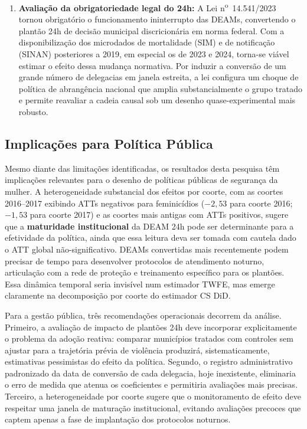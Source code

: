 \documentclass[twocolumn, 10pt]{article}
\begin{document}
\begin{enumerate}
  \item \textbf{Avaliação da obrigatoriedade legal do 24h:} A
        Lei n\textsuperscript{o}~14.541/2023 tornou obrigatório o funcionamento
        ininterrupto das DEAMs, convertendo o plantão 24h de decisão municipal
        discricionária em norma federal. Com a disponibilização dos microdados de
        mortalidade (SIM) e de notificação (SINAN) posteriores a 2019, em especial
        os de 2023 e 2024, torna-se viável estimar o efeito dessa mudança normativa.
        Por induzir a conversão de um grande número de delegacias em janela estreita,
        a lei configura um choque de política de abrangência nacional que amplia
        substancialmente o grupo tratado e permite reavaliar a cadeia causal sob um
        desenho quase-experimental mais robusto.
\end{enumerate}

\subsection{Implicações para Política Pública}

Mesmo diante das limitações identificadas, os resultados desta pesquisa têm
implicações relevantes para o desenho de políticas públicas de segurança da
mulher. A heterogeneidade substancial dos efeitos por coorte, com as coortes
2016--2017 exibindo ATTs negativos para feminicídios ($-2{,}53$ para coorte
2016; $-1{,}53$ para coorte 2017) e as coortes mais antigas com ATTs positivos,
sugere que a \textbf{maturidade institucional} da DEAM 24h pode ser
determinante para a efetividade da política, ainda que essa leitura deva ser
tomada com cautela dado o ATT global não-significativo. DEAMs convertidas mais
recentemente podem precisar de tempo para desenvolver protocolos de atendimento
noturno, articulação com a rede de proteção e treinamento específico para
os plantões. Essa dinâmica temporal seria invisível num estimador TWFE,
mas emerge claramente na decomposição por coorte do estimador CS DiD.

Para a gestão pública, três recomendações operacionais decorrem da análise.
Primeiro, a avaliação de impacto de plantões 24h deve incorporar explicitamente
o problema da adoção reativa: comparar municípios tratados com controles sem
ajustar para a trajetória prévia de violência produzirá, sistematicamente,
estimativas pessimistas do efeito da política. Segundo, o registro administrativo
padronizado da data de conversão de cada delegacia, hoje inexistente, eliminaria
o erro de medida que atenua os coeficientes e permitiria avaliações mais precisas.
Terceiro, a heterogeneidade por coorte sugere que o monitoramento de efeito deve
respeitar uma janela de maturação institucional, evitando avaliações precoces que
captem apenas a fase de implantação dos protocolos noturnos.
\end{document}
